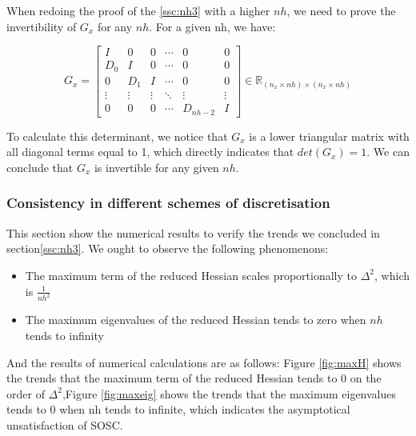 \documentclass{article}
\begin{document}
When redoing the proof of the \ref{ssc:nh3} with a higher $nh$, we need to prove the invertibility of $G_x$ for any $nh$. For a given nh, we have:

\[
G_x = \left[\begin{matrix}
    I & 0 & 0 &\cdots & 0 & 0\\
    D_0 & I & 0 & \cdots & 0 & 0 \\
    0 & D_1 & I & \cdots & 0 & 0 \\
    \vdots & \vdots &\vdots  &\ddots &\vdots &\vdots \\
    0 & 0 & 0 &\cdots & D_{nh-2} & I
\end{matrix} \right]\in \mathbb{R}_{(n_x\times nh)\times(n_x\times nh)}
\]

To calculate this determinant, we notice that $G_x$ is a lower triangular matrix with all diagonal terms equal to 1, which directly indicates that $det(G_x)=1$. 
We can conclude that $G_x$ is invertible for any given $nh$.

\subsubsection{Consistency in different schemes of discretisation}
This section show the numerical results to verify the trends we concluded in section\ref{ssc:nh3}. We ought to observe the following phenomenons: 
\begin{itemize}
    \item The maximum term of the reduced Hessian scales proportionally to $\Delta^2$, which is $\frac{1}{nh^2}$
    \item The maximum eigenvalues of the reduced Hessian tends to zero when $nh$ tends to infinity
\end{itemize}

And the results of numerical calculations are as follows: Figure \ref{fig:maxH} shows the trends that the maximum term of the reduced Hessian tends to 0 on the order of $\Delta^2$,Figure \ref{fig:maxeig} shows the trends that the maximum eigenvalues tends to 0 when nh tends to infinite, which indicates the asymptotical unsatisfaction of SOSC. 
\end{document}
